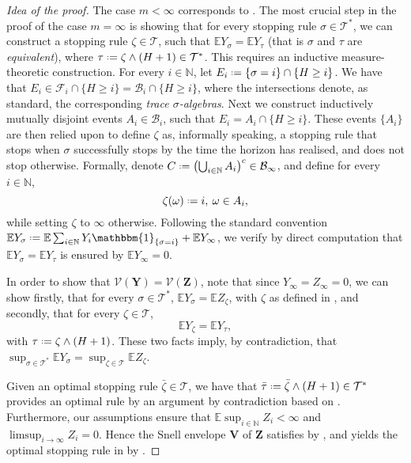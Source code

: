 \documentclass[11pt, a4paper, twoside]{article}
\newcommand*{\defeq}{\mathrel{\vcenter{\baselineskip0.5ex \lineskiplimit0pt
			\hbox{\scriptsize.}\hbox{\scriptsize.}}}=}
\newcommand{\NN}{\mathbb{N}}
\newcommand{\EE}{\mathbb{E}}
\newcommand{\TT}{\mathcal{T}}
\newcommand{\FF}{\mathcal{F}}
\newcommand{\Val}{\mathcal{V}}
\newcommand{\YY}{\mathbf{Y}}
\newcommand{\VV}{\mathbf{V}}
\newcommand{\DZ}{\mathbf{Z}}
\newcommand{\DF}{\mathcal{B}}
\newcommand{\II}{\mathbbm{1}}
\numberwithin{equation}{section}
\begin{document}
        	\begin{proof}[Idea of the proof]
		The case $m<\infty$ corresponds to \cite[Theorem~2.1]{Sam96}. The most crucial step in the proof of the case $m=\infty$ is showing that for every stopping rule $\sigma\in \TT^*$, we can construct a stopping rule $\zeta\in\TT$, such that $\EE Y_\sigma=\EE Y_\tau$ (that is $\sigma$ and $\tau$ are \textit{equivalent}), where $\tau\defeq\zeta\wedge(H+1)\in\TT^*$. This requires an inductive measure-theoretic construction. For every $i\in\NN$, let $E_i\defeq\{\sigma = i\}\cap\{H\ge i\}$. We have that $E_i\in\FF_i\cap\{H\ge i\}=\DF_i\cap\{H\ge i\}$, where the intersections denote, as standard, the corresponding \textit{trace $\sigma$-algebras}. Next we construct inductively mutually disjoint events $A_i\in\DF_i$, such that $E_i=A_i\cap \{H\ge i\}$. These events $\{A_i\}$ are then relied upon to define $\zeta$ as, informally speaking, a stopping rule that stops when $\sigma$ successfully stops by the time the horizon has realised, and does not stop otherwise. Formally, denote $C\defeq\left(\bigcup_{i\in\NN}A_i\right)^c\in\DF_\infty$, and define for every $i\in\NN$,
		\begin{equation}\label{equivstop}
			\zeta(\omega)\defeq i,\:\omega\in A_i, 
		\end{equation}
		while setting $\zeta$ to $\infty$ otherwise. Following the standard convention
		$\EE Y_{\sigma}\defeq \EE\sum_{i\in\NN}Y_i\II_{\{\sigma=i\}}+\EE Y_\infty$,
		we verify by direct computation that $\EE Y_\sigma=\EE Y_\tau$ is ensured by $\EE Y_\infty=0$.
		
		In order to show that $\Val(\YY)=\Val(\DZ)$, note that since $Y_\infty=Z_\infty=0$, we can show firstly, that for every $\sigma\in\TT^*$, $\EE Y_{\sigma}=\EE Z_{\zeta}$, with $\zeta$ as defined in , and secondly, that for every $\zeta\in\TT$, 
    	\begin{equation}\label{optequiv}
        	\EE Y_\zeta=\EE Y_\tau,
    	\end{equation} 
        with $\tau\defeq \zeta\wedge(H+1)$. These two facts imply, by contradiction, that $\sup_{\sigma\in\TT^*}\EE Y_\sigma = \sup_{\zeta\in\TT}\EE Z_\zeta$.
		
		Given an optimal stopping rule $\bar{\zeta}\in\TT$, we have that $\bar{\tau}\defeq\bar{\zeta}\wedge(H+1)\in\TT^*$ provides an optimal rule by an argument by contradiction based on . Furthermore, our assumptions ensure that $\EE \sup_{i\in\NN} Z_i<\infty$ and $\limsup_{i\longrightarrow\infty} Z_i=0$. Hence the Snell envelope $\VV$ of $\DZ$ satisfies  by , and yields the optimal stopping rule in  by .
	\end{proof}
	
\end{document}

